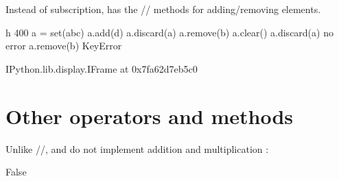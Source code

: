 \documentclass[letterpaper,10pt,english]{sphinxmanual}
\begin{document}

Instead of subscription,  has the // methods for adding/removing elements.

\begin{sphinxVerbatim}[commandchars=\\\{\}]
 \PYGZhy{}h 400
a = set(\PYGZsq{}abc\PYGZsq{})
a.add(\PYGZsq{}d\PYGZsq{})      
a.discard(\PYGZsq{}a\PYGZsq{})  
a.remove(\PYGZsq{}b\PYGZsq{})
a.clear()
a.discard(\PYGZsq{}a\PYGZsq{})  \PYGZsh{} no error
a.remove(\PYGZsq{}b\PYGZsq{})   \PYGZsh{} KeyError
\end{sphinxVerbatim}

\begin{sphinxVerbatim}[commandchars=\\\{\}]
\PYGZlt{}IPython.lib.display.IFrame at 0x7fa62d7eb5c0\PYGZgt{}
\end{sphinxVerbatim}


\section{Other operators and methods}
\label{\detokenize{Lecture8/Dictionaries and Sets:other-operators-and-methods}}
Unlike //,  and  do not implement addition \sphinxcode{\sphinxupquote{+}} and multiplication \sphinxcode{\sphinxupquote{*}}:

\begin{sphinxVerbatim}[commandchars=\\\{\}]
      
         
\end{sphinxVerbatim}

\begin{sphinxVerbatim}[commandchars=\\\{\}]
False
\end{sphinxVerbatim}
\end{document}
